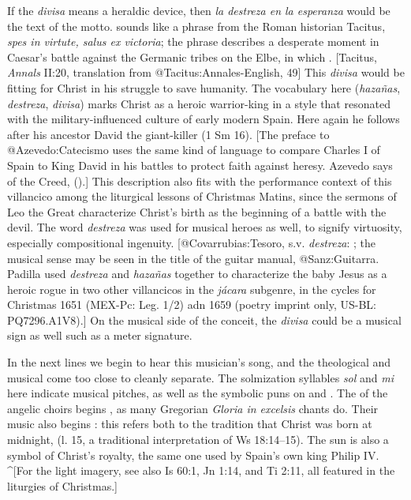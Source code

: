 If the \emph{divisa} means a heraldic device, then \emph{la destreza en la esperanza}
would be the text of the motto.
 sounds like a phrase from the Roman historian
Tacitus, \emph{spes
in virtute, salus ex victoria}; the phrase describes a desperate moment in
Caesar's battle against the Germanic tribes on the Elbe, in which .
[Tacitus, \emph{Annals} II:20, translation from @Tacitus:Annales-English, 49]
This \emph{divisa} would be fitting for Christ in his struggle to save humanity.
The vocabulary here (\emph{hazañas}, \emph{destreza}, \emph{divisa}) marks Christ as a heroic
warrior-king in a style that resonated with the military-influenced culture of
early modern Spain. 
Here again he follows after his ancestor David the giant-killer (1 Sm 16).
[The preface to @Azevedo:Catecismo uses the same kind of language to compare
Charles I of Spain to King David in his battles to protect faith against heresy. 
Azevedo says of the Creed,  ().]
This description also fits with the performance context of this villancico among
the liturgical lessons of Christmas Matins, since the sermons of Leo the Great
characterize Christ's birth as the beginning of a battle with the devil.
The word \emph{destreza} was used for musical heroes as well, to signify virtuosity,
especially compositional ingenuity.
[@Covarrubias:Tesoro, s.v. \emph{destreza}: ; the musical sense may be seen in the title of
the guitar manual, @Sanz:Guitarra.
Padilla used \emph{destreza} and \emph{hazañas} together to characterize the baby Jesus as
a heroic rogue in two other villancicos in the \emph{jácara} subgenre, in the cycles
for Christmas 1651 (MEX-Pc: Leg. 1/2) adn 1659 (poetry imprint only, US-BL:
PQ7296.A1V8).]
On the musical side of the conceit, the \emph{divisa} could be a musical sign as well
such as a meter signature.

In the next lines we begin to hear this musician's song, and the theological and
musical come too close to cleanly separate.
The solmization syllables \emph{sol} and \emph{mi} here indicate musical pitches, as well
as the symbolic puns on  and .
The  of the angelic choirs begins , as many
Gregorian \emph{Gloria
in excelsis} chants do. 
Their music also begins : this refers both to the tradition that
Christ was born at midnight,  (l. 15, a
traditional interpretation of Ws 18:14--15).
The sun is also a symbol of Christ's royalty, the same one used by Spain's own
king Philip IV.
^[For the light imagery, see also Is 60:1, Jn 1:14, and Ti 2:11, all featured in
the liturgies of Christmas.]

